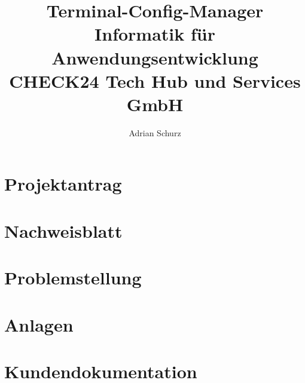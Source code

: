 \documentclass[a4paper,11pt,draft=false,bibliography=totoc]{scrartcl} %
\author{Adrian Schurz}
\title{Terminal-Config-Manager\\
	Informatik für Anwendungsentwicklung\\
	CHECK24 Tech Hub und Services GmbH\\
	}
\begin{document}

\maketitle
{}
\newpage

\section{Projektantrag}


\section{Nachweisblatt} \label{Nachweisblatt}
\paragraph{}

\newpage
\tableofcontents
\newpage


\section{Problemstellung} \label{Problemstellung}

\section{Anlagen} \label{Anlagen}

\section{Kundendokumentation} \label{Kundendokumentation}











\printbibliography

\printglossaries
\end{document}
